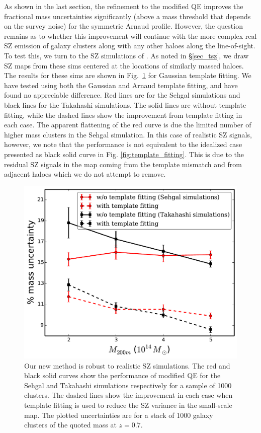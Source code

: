 As shown in the last section, the refinement to the modified QE improves the fractional mass uncertainties significantly (above a mass threshold that depends on the survey noise) for the symmetric Arnaud profile. 
However, the question remains as to whether this improvement will continue with the more complex real SZ emission of galaxy clusters along with any other haloes along the line-of-sight.
To test this, we turn to the SZ simulations of \citet{sehgal10, takahashi17}. 
As noted in \S\ref{sec_tsz}, we draw SZ maps from these sims centered at the locations of similarly massed haloes. 
The results for these sims are shown in Fig.~\ref{fig:realistic_sims} for Gaussian template fitting. 
We have tested using both the Gaussian and Arnaud template fitting, and have found no appreciable difference. 
Red lines are for the Sehgal simulations and black lines for the Takahashi simulations. 
The solid lines are without template fitting, while the dashed lines show the improvement from template fitting in each case. 
 The apparent flattening of the red curve is due the limited number of higher mass clusters in the Sehgal simulation. 
 In this case of realistic SZ signals, however, we note that the performance is not equivalent to the idealized case presented as black solid curve in Fig. \ref{fig:template_fitting}. 
This is due to the residual SZ signals in the map coming from the template mismatch and from adjacent haloes which we do not attempt to remove.
 

\begin{figure}[htb]
\includegraphics[width=\linewidth, keepaspectratio]{figs/Daisuke_Sehgal_results.pdf}
 \caption{
Our new method is robust to realistic SZ simulations. 
The red and black solid curves show the performance of modified QE for the Sehgal and Takahashi simulations respectively for a sample of 1000 clusters. 
The dashed lines show the improvement in each case when template fitting is used to reduce the SZ variance in the small-scale map. 
The plotted uncertainties are for a stack of 1000 galaxy clusters of the quoted mass at $z=0.7$. 
 }
\label{fig:realistic_sims}
\end{figure}

